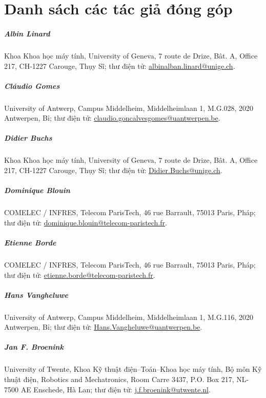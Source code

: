 \chapter*{Danh sách các tác giả đóng góp}

\paragraph{Albin Linard}
Khoa Khoa học máy tính, University of Geneva, 7 route de Drize, Bât. A, Office 217, CH-1227 Carouge, Thụy Sĩ; thư điện tử: \url{albinalban.linard@unige.ch}.

\paragraph{Cláudio Gomes}
University of Antwerp, Campus Middelheim, Middelheimlaan 1, M.G.028, 2020 Antwerpen, Bỉ; thư điện tử: \url{claudio.goncalvesgomes@uantwerpen.be}.

\paragraph{Didier Buchs}
Khoa Khoa học máy tính, University of Geneva, 7 route de Drize, Bât. A, Office 217, CH-1227 Carouge, Thụy Sĩ; thư điện tử: \url{Didier.Buchs@unige.ch}.

\paragraph{Dominique Blouin}
COMELEC / INFRES, Telecom ParisTech, 46 rue Barrault, 75013 Paris, Pháp; thư điện tử: \url{dominique.blouin@telecom-paristech.fr}.

\paragraph{Etienne Borde}
COMELEC / INFRES, Telecom ParisTech, 46 rue Barrault, 75013 Paris, Pháp; thư điện tử: \url{etienne.borde@telecom-paristech.fr}.

\paragraph{Hans Vangheluwe}
University of Antwerp, Campus Middelheim, Middelheimlaan 1, M.G.116, 2020 Antwerpen, Bỉ; thư điện tử: \url{Hans.Vangheluwe@uantwerpen.be}.

\paragraph{Jan F. Broenink}
University of Twente, Khoa Kỹ thuật điện--Toán--Khoa học máy tính, Bộ môn Kỹ thuật điện, Robotics and Mechatronics, Room Carre 3437, P.O. Box 217, NL-7500 AE Enschede, Hà Lan; thư điện tử: \url{j.f.broenink@utwente.nl}.

